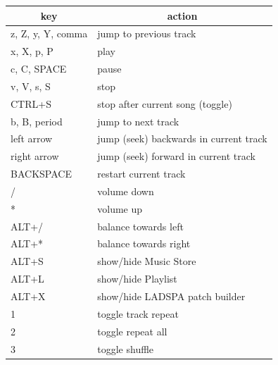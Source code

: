 \documentclass[10pt,english]{article}
\begin{document}
\begin{center}\begin{tabular}{|m{4cm}|m{10cm}|}\hline \multicolumn{1}{|c|}{\textbf{key}} & \multicolumn{1}{c|}{\textbf{action}} \\ \hline \hline 

z, Z, y, Y, comma&
jump to previous track
\\ \hline 

x, X, p, P&
play
\\ \hline 

c, C, SPACE&
pause
\\ \hline 

v, V, s, S&
stop
\\ \hline 

CTRL+S&
stop after current song (toggle)
\\ \hline 

b, B, period&
jump to next track
\\ \hline 
\hline 

left arrow&
jump (seek) backwards in current track
\\ \hline 

right arrow&
jump (seek) forward in current track
\\ \hline 

BACKSPACE&
restart current track
\\ \hline 
\hline 

/&
volume down
\\ \hline 

*&
volume up
\\ \hline 

ALT+/&
balance towards left
\\ \hline 

ALT+*&
balance towards right
\\ \hline 
\hline 

ALT+S&
show/hide Music Store
\\ \hline 

ALT+L&
show/hide Playlist
\\ \hline 

ALT+X&
show/hide LADSPA patch builder
\\ \hline 

1&
toggle track repeat
\\ \hline 

2&
toggle repeat all
\\ \hline 

3&
toggle shuffle
\\ \hline 
\hline 


\end{tabular}
\end{center}
\end{document}
